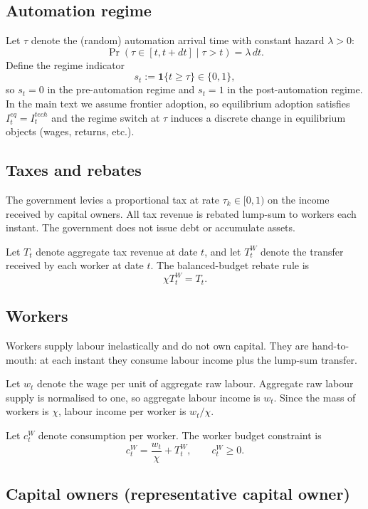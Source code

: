 \documentclass{article}
\begin{document}
\subsection{Automation regime}

Let $\tau$ denote the (random) automation arrival time with constant hazard $\lambda>0$:
$$
\Pr(\tau \in [t,t+dt] \mid \tau>t) = \lambda\,dt.
$$
Define the regime indicator
$$
s_t := \mathbf{1}\{t \ge \tau\} \in \{0,1\},
$$
so $s_t=0$ in the pre-automation regime and $s_t=1$ in the post-automation regime. In the main text we assume frontier adoption, so equilibrium adoption satisfies $I^{eq}_t = I^{tech}_t$ and the regime switch at $\tau$ induces a discrete change in equilibrium objects (wages, returns, etc.).

\subsection{Taxes and rebates}

The government levies a proportional tax at rate $\tau_k \in [0,1)$ on the income received by capital owners. All tax revenue is rebated lump-sum to workers each instant. The government does not issue debt or accumulate assets.

Let $T_t$ denote aggregate tax revenue at date $t$, and let $T^W_t$ denote the transfer received by each worker at date $t$. The balanced-budget rebate rule is
$$
\chi T^W_t = T_t.
$$

\subsection{Workers}

Workers supply labour inelastically and do not own capital. They are hand-to-mouth: at each instant they consume labour income plus the lump-sum transfer.

Let $w_t$ denote the wage per unit of aggregate raw labour. Aggregate raw labour supply is normalised to one, so aggregate labour income is $w_t$. Since the mass of workers is $\chi$, labour income per worker is $w_t/\chi$.

Let $c^W_t$ denote consumption per worker. The worker budget constraint is
$$
c^W_t = \frac{w_t}{\chi} + T^W_t,
\qquad c^W_t \ge 0.
$$

\subsection{Capital owners (representative capital owner)}
\end{document}
